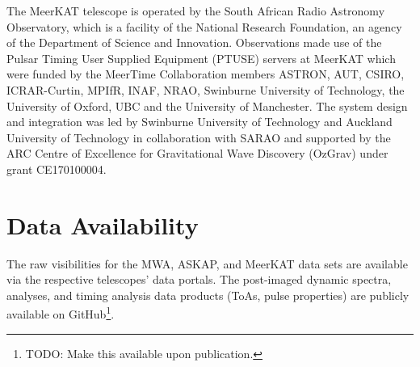\documentclass[fleqn,usenatbib]{mnras}
\begin{document}
The MeerKAT telescope is operated by the South African Radio Astronomy Observatory, which is a facility of the National Research Foundation, an agency of the Department of Science and Innovation.
  Observations made use of the Pulsar Timing User Supplied Equipment (PTUSE) servers at MeerKAT which were funded by the MeerTime Collaboration members ASTRON, AUT, CSIRO, ICRAR-Curtin, MPIfR, INAF, NRAO, Swinburne University of Technology, the University of Oxford, UBC and the University of Manchester.  The system design and integration was led by Swinburne University of Technology and Auckland University of Technology in collaboration with SARAO and supported by the ARC Centre of Excellence for Gravitational Wave Discovery (OzGrav) under grant CE170100004.

\section*{Data Availability}

The raw visibilities for the MWA, ASKAP, and MeerKAT data sets are available via the respective telescopes' data portals. 
The post-imaged dynamic spectra, analyses, and timing analysis data products (ToAs, pulse properties) are publicly available on GitHub\footnote{TODO: Make this available upon publication.}.
 








\end{document}
